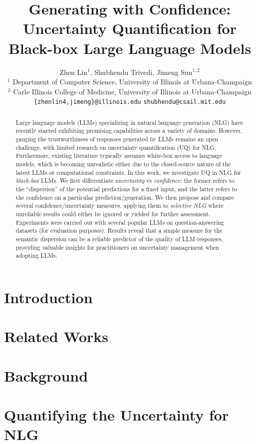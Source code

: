 \documentclass{article} %
\title{Generating with Confidence: Uncertainty Quantification for Black-box Large Language Models}
\author{%
  Zhen Lin$^{1}$, %
  \hspace{1mm}
  Shubhendu Trivedi,
  \hspace{1mm}
  Jimeng Sun$^{1,2}$ \\
  $^1$ Department of Computer Science, University of Illinois at Urbana-Champaign\\
  $^2$ Carle Illinois College of Medicine, University of Illinois at Urbana-Champaign\\
  {\small \texttt{\{zhenlin4,jimeng\}@illinois.edu} \hspace{2mm} \texttt{shubhendu@csail.mit.edu}}
}
\begin{document}
\maketitle

\begin{abstract}
Large language models (LLMs) specializing in natural language generation (NLG) have recently started exhibiting promising capabilities across a variety of domains. 
However, gauging the trustworthiness of responses generated by LLMs remains an open challenge, with limited research on uncertainty quantification (UQ) for NLG.
Furthermore, existing literature typically assumes white-box access to language models, which is becoming unrealistic either due to the closed-source nature of the latest LLMs or computational constraints. 
In this work, we investigate UQ in NLG for \textit{black-box} LLMs. 
We first differentiate \textit{uncertainty} vs \textit{confidence}: the former refers to the ``dispersion'' of the potential predictions for a fixed input, and the latter refers to the confidence on a particular prediction/generation.
We then propose and compare several confidence/uncertainty measures, applying them to \textit{selective NLG} where unreliable results could either be ignored or yielded for further assessment. 
Experiments were carried out with several popular LLMs on question-answering datasets (for evaluation purposes).
Results reveal that a simple measure for the semantic dispersion can be a reliable predictor of the quality of LLM responses, providing valuable insights for practitioners on uncertainty management when adopting LLMs.
\end{abstract}

\section{Introduction}\label{sec:intro}


\section{Related Works}\label{sec:related}


\section{Background}\label{sec:background}


\section{Quantifying the Uncertainty for NLG}\label{sec:methods}

\end{document}
